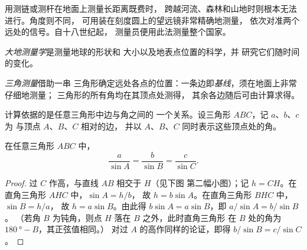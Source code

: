 用测链或测杆在地面上测量长距离既费时，
跨越河流、森林和山地时则根本无法进行。角度则不同，
可用装在刻度圆上的望远镜非常精确地测量，
依次对准两个远处的信号。自十八世纪起，
测量员便用此法测量整个国家。

\begin{definition}[大地测量学]\label{def:g10:measuring-the-earth:geodesy}
\emph{大地测量学}是测量地球的形状和
大小以及地表点位置的科学，并
研究它们随时间的变化。
\end{definition}

\begin{definition}[三角测量]\label{def:g10:measuring-the-earth:triangulation}
\emph{三角测量}借助一串
三角形确定远处各点的位置：一条边即\emph{基线}，须在地面上非常仔细地测量；
三角形的所有角均在其顶点处测得，
其余各边随后可由计算求得。
\end{definition}

计算依据的是任意三角形中边与角之间的
一个关系。设三角形 $ABC$，记 $a$、$b$、$c$ 为
与顶点 $A$、$B$、$C$ 相对的边，
并以 $A$、$B$、$C$ 同时表示这些顶点处的角。

\begin{proposition}[正弦定理]\label{prop:g10:measuring-the-earth:sine-rule}
在任意三角形 $ABC$ 中，
\[
  \frac{a}{\sin A} = \frac{b}{\sin B} = \frac{c}{\sin C}.
\]
\end{proposition}

\begin{proof}
过 $C$ 作高，与直线 $AB$ 相交于 $H$（见下图
第二幅小图）；记 $h = CH$。在直角三角形 $AHC$ 中，$\sin A = h/b$，
故 $h = b \sin A$。在直角三角形 $BHC$ 中，$\sin B = h/a$，
故 $h = a \sin B$。由此得 $b \sin A = a \sin B$，即 $a/\sin A = b/\sin B$。
（若角 $B$ 为钝角，则点 $H$ 落在 $B$ 之外，此时直角三角形
在 $B$ 处的角为 $\qty{180}{\degree} - B$，其正弦值相同。）
对过 $A$ 的高作同样的论证，即得 $b/\sin B = c/\sin C$。
\end{proof}

